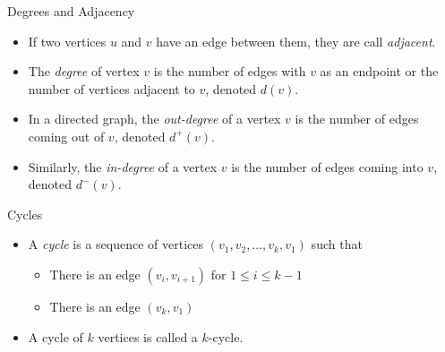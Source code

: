 \documentclass[aspectratio=169, handout]{beamer}
\begin{document}
\begin{frame}{Degrees and Adjacency}
    \begin{itemize}
        \item If two vertices $u$ and $v$ have an edge between them, they are call \emph{adjacent}. \pause
        \item The \emph{degree} of vertex $v$ is the number of edges with $v$ as an endpoint or the number of vertices adjacent to $v$, denoted $d(v)$. \pause
        \item In a directed graph, the \emph{out-degree} of a vertex $v$ is the number of edges coming out of $v$, denoted $d^+(v)$. \pause
        \item Similarly, the \emph{in-degree} of a vertex $v$ is the number of edges coming into $v$, denoted $d^-(v)$.
    \end{itemize}
\end{frame}

\begin{frame}{Cycles}
    \begin{itemize}
        \item A \emph{cycle} is a sequence of vertices $(v_1, v_2, \dots, v_k, v_1)$ such that \pause
        \begin{itemize}
            \item There is an edge $(v_i, v_{i + 1})$ for $1 \leq i \leq k - 1$ \pause
            \item There is an edge $(v_k, v_1)$ \pause
        \end{itemize}
        \item A cycle of $k$ vertices is called a $k$-cycle.
    \end{itemize}
    \pause
    \begin{center}
    \end{center}
\end{frame}
\end{document}
